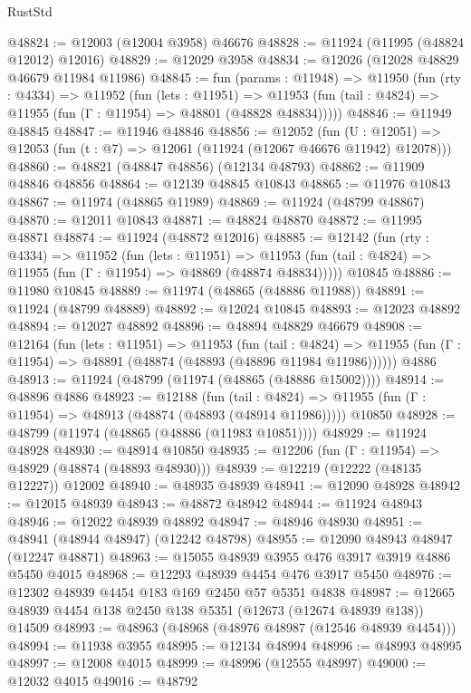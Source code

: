 \begin{lexlean}{RustStd}
\begin{coremodule}
@48824 := @12003 (@12004 @3958) @46676
@48828 := @11924 (@11995 (@48824 @12012) @12016)
@48829 := @12029 @3958
@48834 := @12026 (@12028 @48829 @46679 @11984 @11986)
@48845 := fun (params : @11948) =>
  @11950
    (fun (rty : @4334) =>
    @11952
      (fun (lets : @11951) =>
      @11953 (fun (tail : @4824) => @11955 (fun (Γ : @11954) => @48801 (@48828 @48834)))))
@48846 := @11949 @48845
@48847 := @11946 @48846
@48856 := @12052
    (fun (U : @12051) => @12053 (fun (t : @7) => @12061 (@11924 (@12067 @46676 @11942) @12078)))
@48860 := @48821 (@48847 @48856) (@12134 @48793)
@48862 := @11909 @48846 @48856
@48864 := @12139 @48845 @10843
@48865 := @11976 @10843
@48867 := @11974 (@48865 @11989)
@48869 := @11924 (@48799 @48867)
@48870 := @12011 @10843
@48871 := @48824 @48870
@48872 := @11995 @48871
@48874 := @11924 (@48872 @12016)
@48885 := @12142
    (fun (rty : @4334) =>
    @11952
      (fun (lets : @11951) =>
      @11953 (fun (tail : @4824) => @11955 (fun (Γ : @11954) => @48869 (@48874 @48834)))))
    @10845
@48886 := @11980 @10845
@48889 := @11974 (@48865 (@48886 @11988))
@48891 := @11924 (@48799 @48889)
@48892 := @12024 @10845
@48893 := @12023 @48892
@48894 := @12027 @48892
@48896 := @48894 @48829 @46679
@48908 := @12164
    (fun (lets : @11951) =>
    @11953
      (fun (tail : @4824) =>
      @11955 (fun (Γ : @11954) => @48891 (@48874 (@48893 (@48896 @11984 @11986))))))
    @4886
@48913 := @11924 (@48799 (@11974 (@48865 (@48886 @15002))))
@48914 := @48896 @4886
@48923 := @12188
    (fun (tail : @4824) => @11955 (fun (Γ : @11954) => @48913 (@48874 (@48893 (@48914 @11986)))))
    @10850
@48928 := @48799 (@11974 (@48865 (@48886 (@11983 @10851))))
@48929 := @11924 @48928
@48930 := @48914 @10850
@48935 := @12206 (fun (Γ : @11954) => @48929 (@48874 (@48893 @48930)))
@48939 := @12219 (@12222 (@48135 @12227)) @12002
@48940 := @48935 @48939
@48941 := @12090 @48928
@48942 := @12015 @48939
@48943 := @48872 @48942
@48944 := @11924 @48943
@48946 := @12022 @48939 @48892
@48947 := @48946 @48930
@48951 := @48941 (@48944 @48947) (@12242 @48798)
@48955 := @12090 @48943 @48947 (@12247 @48871)
@48963 := @15055 @48939 @3955 @476 @3917 @3919 @4886 @5450 @4015
@48968 := @12293 @48939 @4454 @476 @3917 @5450
@48976 := @12302 @48939 @4454 @183 @169 @2450 @57 @5351 @4838
@48987 := @12665 @48939 @4454 @138 @2450 @138 @5351 (@12673 (@12674 @48939 @138)) @14509
@48993 := @48963 (@48968 (@48976 @48987 (@12546 @48939 @4454)))
@48994 := @11938 @3955
@48995 := @12134 @48994
@48996 := @48993 @48995
@48997 := @12008 @4015
@48999 := @48996 (@12555 @48997)
@49000 := @12032 @4015
@49016 := @48792

\end{coremodule}
\end{lexlean}
